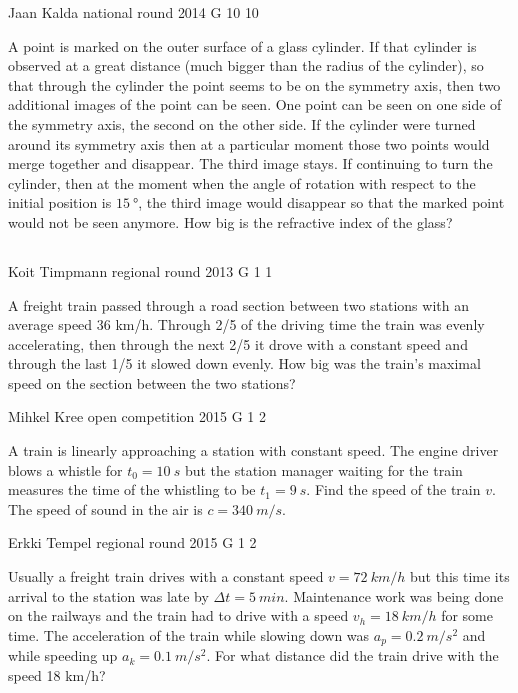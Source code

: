 \documentclass[11pt]{article}
\begin{document}
{Jaan Kalda} %
{national round} %
{2014} %
{G 10} %
{10} %
{

\ifEngStatement
A point is marked on the outer surface of a glass cylinder. If that cylinder is observed at a great distance (much bigger than the radius of the cylinder), so that through the cylinder the point seems to be on the symmetry axis, then two additional images of the point can be seen. One point can be seen on one side of the symmetry axis, the second on the other side. If the cylinder were turned around its symmetry axis then at a particular moment those two points would merge together and disappear. The third image stays. If continuing to turn the cylinder, then at the moment when the angle of rotation with respect to the initial position is $\SI{15}{\degree}$, the third image would disappear so that the marked point would not be seen anymore. How big is the refractive index of the glass?
\fi
}
\newpage\subsection{\protect{}}

{Koit Timpmann} %
{regional round} %
{2013} %
{G 1} %
{1} %
{

\ifEngStatement
A freight train passed through a road section between two stations with an average speed 36 km/h. Through 2/5 of the driving time the train was evenly accelerating, then through the next 2/5 it drove with a constant speed and through the last 1/5 it slowed down evenly. How big was the train’s maximal speed on the section between the two stations?
\fi
}

{Mihkel Kree} %
{open competition} %
{2015} %
{G 1} %
{2} %
{

\ifEngStatement
A train is linearly approaching a station with constant speed. The engine driver blows a whistle for $t_0=\SI{10}{s}$ but the station manager waiting for the train measures the time of the whistling to be $t_1=\SI{9}{s}$. Find the speed of the train $v$. The speed of sound in the air is $c=\SI{340}{m/s}$.
\fi
}

{Erkki Tempel} %
{regional round} %
{2015} %
{G 1} %
{2} %
{

\ifEngStatement
Usually a freight train drives with a constant speed $v=\SI{72}{km/h}$ but this time its arrival to the station was late by $\Delta t=\SI{5}{min}$. Maintenance work was being done on the railways and the train had to drive with a speed $v_{h}=\SI{18}{km/h}$ for some time. The acceleration of the train while slowing down was $a_p=\SI{0,2}{m/s^2}$ and while speeding up $a_k=\SI{0,1}{m/s^2}$. For what distance did the train drive with the speed 18 km/h?
\fi
}
\end{document}
